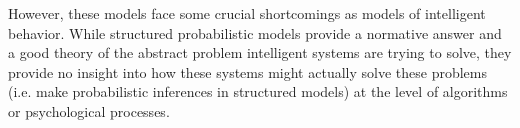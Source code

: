 However, these models face some crucial shortcomings as models of intelligent behavior. 
While structured probabilistic models provide a normative answer and a good theory of the abstract problem intelligent systems are trying to solve, they provide no insight into how these systems might actually solve these problems (i.e. make probabilistic inferences in structured models) at the level of algorithms or psychological processes\citep{marr1976understanding}. %

